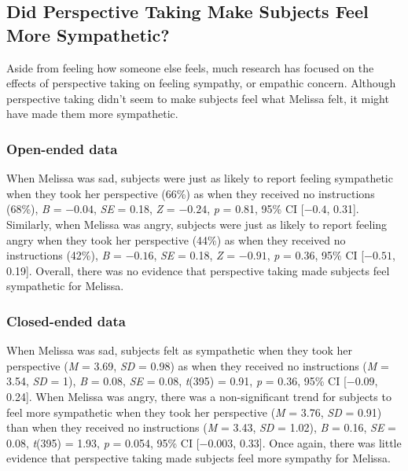 \documentclass[man,a4paper,noextraspace,apacite]{apa6}\usepackage[]{graphicx}\usepackage[]{color}
\begin{document}
\subsection{Did Perspective Taking Make Subjects Feel More Sympathetic?}

Aside from feeling how someone else feels, much research has focused on the effects of perspective taking on feeling sympathy, or empathic concern. Although perspective taking didn't seem to make subjects feel what Melissa felt, it might have made them more sympathetic.

\subsubsection{Open-ended data}


When Melissa was sad, subjects were just as likely to report feeling sympathetic when they took her perspective (66\%) as when they received no instructions (68\%), \textit{B} = \ensuremath{-0.04}, \textit{SE} = 0.18, \textit{Z} = \ensuremath{-0.24}, \textit{p} = 0.81, 95\% CI [\ensuremath{-0.4}, 0.31]. Similarly, when Melissa was angry, subjects were just as likely to report feeling angry when they took her perspective (44\%) as when they received no instructions (42\%), \textit{B} = \ensuremath{-0.16}, \textit{SE} = 0.18, \textit{Z} = \ensuremath{-0.91}, \textit{p} = 0.36, 95\% CI [\ensuremath{-0.51}, 0.19]. Overall, there was no evidence that perspective taking made subjects feel sympathetic for Melissa.

\subsubsection{Closed-ended data}



When Melissa was sad, subjects felt as sympathetic when they took her perspective (\textit{M} = 3.69, \textit{SD} = 0.98) as when they received no instructions (\textit{M} = 3.54, \textit{SD} = 1), \textit{B} = 0.08, \textit{SE} = 0.08, \textit{t}(395) = 0.91, \textit{p} = 0.36, 95\% CI [\ensuremath{-0.09}, 0.24]. When Melissa was angry, there was a non-significant trend for subjects to feel more sympathetic when they took her perspective (\textit{M} = 3.76, \textit{SD} = 0.91) than when they received no instructions (\textit{M} = 3.43, \textit{SD} = 1.02), \textit{B} = 0.16, \textit{SE} = 0.08, \textit{t}(395) = 1.93, \textit{p} = 0.054, 95\% CI [\ensuremath{-0.003}, 0.33]. Once again, there was little evidence that perspective taking made subjects feel more sympathy for Melissa.
\end{document}
